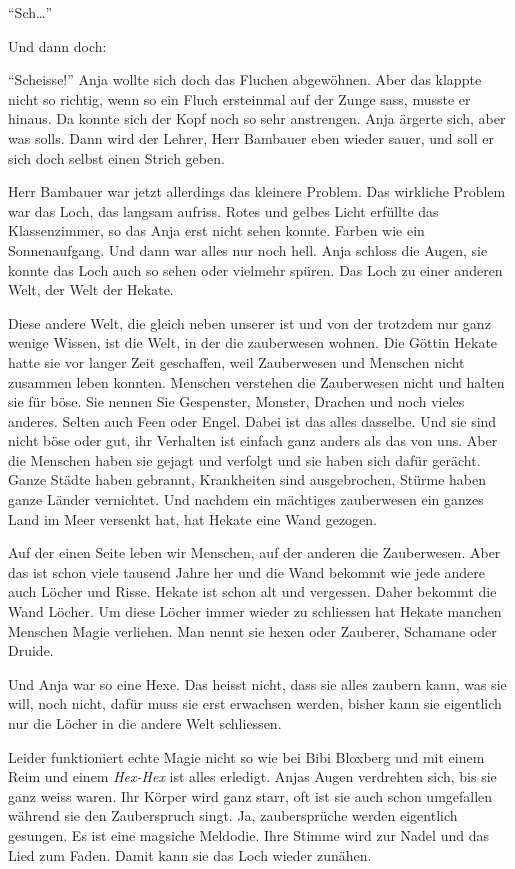 \enquote{Sch\dots}

Und dann doch:

\enquote{Scheisse!} Anja wollte sich doch das Fluchen abgewöhnen. Aber das klappte nicht so richtig, wenn so ein Fluch ersteinmal auf der Zunge sass, musste er hinaus. Da konnte sich der Kopf noch so sehr anstrengen. Anja ärgerte sich, aber was solls. Dann wird der Lehrer, Herr Bambauer eben wieder sauer, und soll er sich doch selbst einen Strich geben. 

Herr Bambauer war jetzt allerdings das kleinere Problem. Das wirkliche Problem war das Loch, das langsam aufriss. Rotes und gelbes Licht erfüllte das Klassenzimmer, so das Anja erst nicht sehen konnte. Farben wie ein Sonnenaufgang. Und dann war alles nur noch hell. Anja schloss die Augen, sie konnte das Loch auch so sehen oder vielmehr spüren. Das Loch zu einer anderen Welt, der Welt der Hekate.

Diese andere Welt, die gleich neben unserer ist und von der trotzdem nur ganz wenige Wissen, ist die Welt, in der die zauberwesen wohnen. Die Göttin Hekate hatte sie vor langer Zeit geschaffen, weil Zauberwesen und Menschen nicht zusammen leben konnten. Menschen verstehen die Zauberwesen nicht und halten sie für böse. Sie nennen Sie Gespenster, Monster, Drachen und noch vieles anderes. Selten auch Feen oder Engel. Dabei ist das alles dasselbe. Und sie sind nicht böse oder gut, ihr Verhalten ist einfach ganz anders als das von uns. Aber die Menschen haben sie gejagt und verfolgt und sie haben sich dafür gerächt. Ganze Städte haben gebrannt, Krankheiten sind ausgebrochen, Stürme haben ganze Länder vernichtet. Und nachdem ein mächtiges zauberwesen ein ganzes Land im Meer versenkt hat, hat Hekate eine Wand gezogen.

Auf der einen Seite leben wir Menschen, auf der anderen die Zauberwesen. Aber das ist schon viele tausend Jahre her und die Wand bekommt wie jede andere auch Löcher und Risse. Hekate ist schon alt und vergessen. Daher bekommt die Wand Löcher. Um diese Löcher immer wieder zu schliessen hat Hekate manchen Menschen Magie verliehen. Man nennt sie hexen oder Zauberer, Schamane oder Druide. 

Und Anja war so eine Hexe. Das heisst nicht, dass sie alles zaubern kann, was sie will, noch nicht, dafür muss sie erst erwachsen werden, bisher kann sie eigentlich nur die Löcher in die andere Welt schliessen.

Leider funktioniert echte Magie nicht so wie bei Bibi Bloxberg und mit einem Reim und einem \textit{Hex-Hex} ist alles erledigt. Anjas Augen verdrehten sich, bis sie ganz weiss waren. Ihr Körper wird ganz starr, oft ist sie auch schon umgefallen während sie den Zauberspruch singt. Ja, zaubersprüche werden eigentlich gesungen. Es ist eine magsiche Meldodie. Ihre Stimme wird zur Nadel und das Lied zum Faden. Damit kann sie das Loch wieder zunähen.

